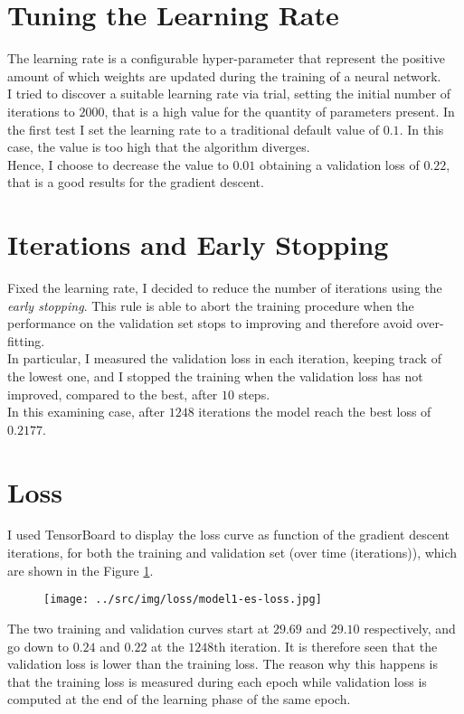 \documentclass[a4paper,12pt]{article} %
\begin{document}
	\section{Tuning the Learning Rate}
	The learning rate is a configurable hyper-parameter that represent the positive amount of which weights are updated during the training of a neural network.\\
	I tried to discover a suitable learning rate via trial, setting the initial 
	number of iterations to $2000$, that is a high value for the quantity of 
	parameters present.
	In the first test I set the learning rate to a traditional default value of $0.1$. In this case, the value is too high that the algorithm diverges.\\
	Hence, I choose to decrease the value to $0.01$ obtaining a validation loss of $0.22$, that is a good results for the gradient descent.
	
	\section{Iterations and Early Stopping}
	Fixed the learning rate, I decided to reduce the number of iterations using 
	the \textit{early stopping}. This rule is able to abort the training 
	procedure when the performance on the validation set stops to improving and 
	therefore avoid over-fitting. \\
	In particular, I measured the validation loss in each iteration, keeping track of the lowest one, and I stopped the training when the validation loss has not improved, compared to the best, after $10$ steps.\\
	In this examining case, after $1248$ iterations the model reach the best loss of $0.2177$.
	
	\section{Loss}
	I used {TensorBoard} to display the loss curve as function of the gradient 
	descent iterations, for both the 
	training and validation set (over time (iterations)), which are shown in 
	the Figure \ref{fig:model1-loss}.
	
	\begin{figure}[ht]
		\centering
		\texttt{[image: ../src/img/loss/model1-es-loss.jpg]}
		\label{fig:model1-loss}
	\end{figure}
	
	The two training and validation curves start at $29.69$ and $29.10$ respectively, and go down to $0.24$ and $0.22$ at the $1248\mathrm{th}$ iteration.
	It is therefore seen that the validation loss is lower than the training loss. The reason why this happens is that the training loss is measured during each epoch while validation loss is computed at the end of the learning phase of the same epoch.
	
\end{document}
